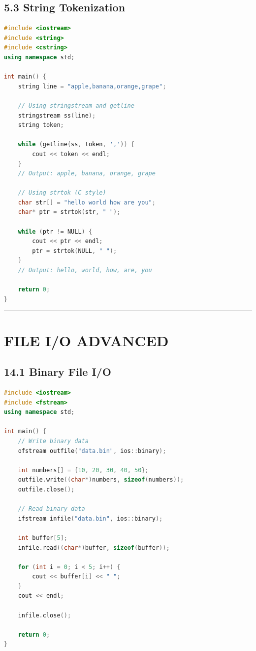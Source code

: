 \hypertarget{string-tokenization}{%
\subsection{5.3 String Tokenization}\label{string-tokenization}}

\begin{lstlisting}[language={C++}]
#include <iostream>
#include <string>
#include <cstring>
using namespace std;

int main() {
    string line = "apple,banana,orange,grape";

    // Using stringstream and getline
    stringstream ss(line);
    string token;

    while (getline(ss, token, ',')) {
        cout << token << endl;
    }
    // Output: apple, banana, orange, grape

    // Using strtok (C style)
    char str[] = "hello world how are you";
    char* ptr = strtok(str, " ");

    while (ptr != NULL) {
        cout << ptr << endl;
        ptr = strtok(NULL, " ");
    }
    // Output: hello, world, how, are, you

    return 0;
}
\end{lstlisting}

\begin{center}\rule{0.5\linewidth}{0.5pt}\end{center}

\hypertarget{file-io-advanced}{%
\section{FILE I/O ADVANCED}\label{file-io-advanced}}

\hypertarget{binary-file-io}{%
\subsection{14.1 Binary File I/O}\label{binary-file-io}}

\begin{lstlisting}[language={C++}]
#include <iostream>
#include <fstream>
using namespace std;

int main() {
    // Write binary data
    ofstream outfile("data.bin", ios::binary);

    int numbers[] = {10, 20, 30, 40, 50};
    outfile.write((char*)numbers, sizeof(numbers));
    outfile.close();

    // Read binary data
    ifstream infile("data.bin", ios::binary);

    int buffer[5];
    infile.read((char*)buffer, sizeof(buffer));

    for (int i = 0; i < 5; i++) {
        cout << buffer[i] << " ";
    }
    cout << endl;

    infile.close();

    return 0;
}
\end{lstlisting}


